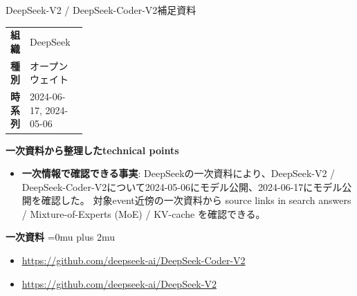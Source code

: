 \begin{technicalnote}{DeepSeek-V2 / DeepSeek-Coder-V2}{補足資料}
\begingroup
\begin{tabularx}{\linewidth}{@{}>{\bfseries}p{0.22\linewidth}X@{}}
組織 & DeepSeek \\
種別 & オープンウェイト \\
時系列 & 2024-06-17, 2024-05-06 \\
\end{tabularx}
\smallskip
\begin{minipage}{\linewidth}
{\bfseries 一次資料から整理したtechnical points}
\begin{itemize}[leftmargin=1.5em,itemsep=0.35em]
\item \textbf{一次情報で確認できる事実}: DeepSeekの一次資料により、DeepSeek-V2 / DeepSeek-Coder-V2について2024-05-06にモデル公開、2024-06-17にモデル公開を確認した。 対象event近傍の一次資料から source links in search answers / Mixture-of-Experts (MoE) / KV-cache を確認できる。
\end{itemize}
\begin{minipage}{\linewidth}
\begin{samepage}
{\bfseries 一次資料}
\begingroup\sloppy
\Urlmuskip=0mu plus 2mu\relax
\begin{itemize}[leftmargin=1.5em,itemsep=0.25em]
\item {\scriptsize\url{https://github.com/deepseek-ai/DeepSeek-Coder-V2}}
\item {\scriptsize\url{https://github.com/deepseek-ai/DeepSeek-V2}}
\end{itemize}
\endgroup
\end{samepage}
\end{minipage}
\end{minipage}
\endgroup
\end{technicalnote}
\medskip
